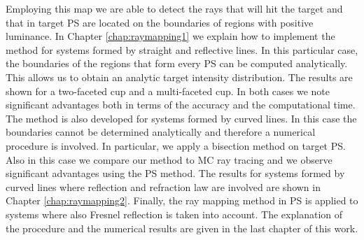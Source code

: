 Employing this map we are able to detect the rays that will hit the target and that in target PS are located on the boundaries of regions with positive luminance. 
In Chapter \ref{chap:raymapping1} we explain how to implement the method for systems formed by straight and reflective lines. In this particular case, the boundaries of the regions that form every PS can be computed analytically. This allows us to obtain an analytic target intensity distribution. The results are shown for a two-faceted cup and a multi-faceted cup. In both cases we note significant advantages both in terms of the accuracy and the computational time. The method is also developed for systems formed by curved lines. In this case the boundaries cannot be determined analytically and therefore a numerical procedure is involved. In particular, we apply a bisection method on target PS. Also in this case we compare our method to MC ray tracing and we observe significant advantages using the PS method. The results for systems formed by curved lines where reflection and refraction law are involved are shown in Chapter \ref{chap:raymapping2}. Finally, the ray mapping method in PS is applied to systems where also Fresnel reflection is taken into account. The explanation of the procedure and the numerical results are given in the last chapter of this work.